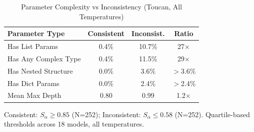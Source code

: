 \documentclass{article}
\theoremstyle{plain}
\theoremstyle{definition}
\begin{document}
\begin{table}[h]
\centering
\caption{Parameter Complexity vs Inconsistency (Toucan, All Temperatures)}
\label{tab:complexity-main}
\scriptsize
\begin{tabular}{@{}lccc@{}}
\toprule
\textbf{Parameter Type} & \textbf{Consistent} & \textbf{Inconsist.} & \textbf{Ratio} \\
\midrule
Has List Params & 0.4\% & 10.7\% & 27$\times$ \\
Has Any Complex Type & 0.4\% & 11.5\% & 29$\times$ \\
Has Nested Structure & 0.0\% & 3.6\% & $>$3.6\% \\
Has Dict Params & 0.0\% & 2.4\% & $>$2.4\% \\
\midrule
Mean Max Depth & 0.80 & 0.99 & 1.2$\times$ \\
\bottomrule
\end{tabular}

\vspace{0.3em}
\raggedright\scriptsize Consistent: $S_\alpha \geq 0.85$ (N=252); Inconsistent: $S_\alpha \leq 0.58$ (N=252). Quartile-based thresholds across 18 models, all temperatures.
\end{table}
\end{document}
